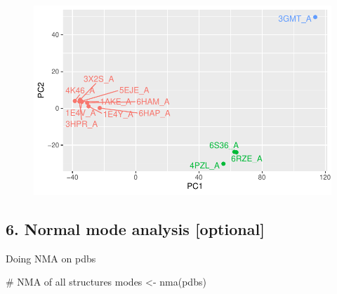\documentclass[
  letterpaper,
  DIV=11,
  numbers=noendperiod]{scrartcl}
\newenvironment{Shaded}{\begin{snugshade}}{\end{snugshade}}
\newcommand{\CommentTok}[1]{\textcolor[rgb]{0.37,0.37,0.37}{#1}}
\newcommand{\FunctionTok}[1]{\textcolor[rgb]{0.28,0.35,0.67}{#1}}
\newcommand{\NormalTok}[1]{\textcolor[rgb]{0.00,0.23,0.31}{#1}}
\newcommand{\OtherTok}[1]{\textcolor[rgb]{0.00,0.23,0.31}{#1}}
\begin{document}
\begin{figure}[H]

{\centering \includegraphics{class09_files/figure-pdf/unnamed-chunk-18-1.pdf}

}

\end{figure}

\hypertarget{normal-mode-analysis-optional}{%
\subsection{6. Normal mode analysis
{[}optional{]}}\label{normal-mode-analysis-optional}}

Doing NMA on pdbs

\begin{Shaded}
\begin{Highlighting}[]
\CommentTok{\# NMA of all structures}
\NormalTok{modes }\OtherTok{\textless{}{-}} \FunctionTok{nma}\NormalTok{(pdbs)}
\end{Highlighting}
\end{Shaded}
\end{document}
